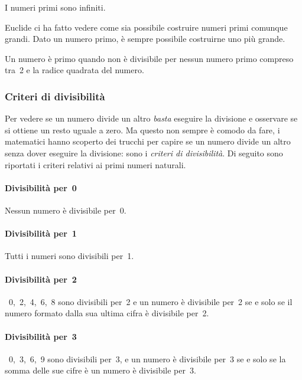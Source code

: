 \begin{teorema}[di Euclide]
I numeri primi sono infiniti.
\end{teorema}

Euclide ci ha fatto vedere come sia possibile costruire numeri primi comunque 
grandi. Dato un numero primo, è sempre possibile costruirne uno più grande.


\osservazione Un numero è primo quando non è divisibile per nessun numero 
primo compreso tra~2 e la radice quadrata del numero.

\subsubsection{Criteri di divisibilità}
\label{sec:01_divisibilita}

Per vedere se un numero divide un altro \emph{basta} eseguire la 
divisione e osservare se si ottiene un resto uguale a zero. 
Ma questo non sempre è comodo da fare, i matematici hanno scoperto dei
trucchi per capire se un numero divide un altro senza dover eseguire 
la divisione: sono i \emph{criteri di divisibilità}. 
Di seguito sono riportati i criteri relativi ai primi numeri naturali.

\paragraph{Divisibilità per~0} Nessun numero è divisibile per~0.

\paragraph{Divisibilità per~1} Tutti i numeri sono divisibili per~1.

\paragraph{Divisibilità per~2}~0,~2,~4,~6,~8 sono divisibili per~2 
e un numero è divisibile per~2 se e solo se il numero formato dalla sua 
ultima cifra è divisibile per~2.

\paragraph{Divisibilità per~3}~0,~3,~6,~9 sono divisibili per~3,
e un numero è divisibile per~3 se e solo se la somma delle sue cifre è un 
numero è divisibile per~3.

